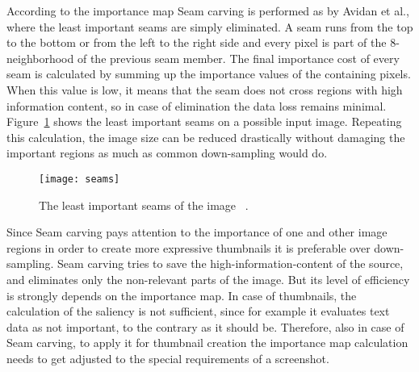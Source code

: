 \documentclass[draft,final]{vutinfth} %
\begin{document}
	According to the importance map Seam carving is performed as by Avidan et al.\cite{avidan2007seam}, where the least important seams are simply eliminated.
	A seam runs from the top to the bottom or from the left to the right side and every pixel is part of the 8-neighborhood of the previous seam member.
	The final importance cost of every seam is calculated by summing up the importance values of the containing pixels.
	When this value is low, it means that the seam does not cross regions with high information content, so in case of elimination the data loss remains minimal.
	Figure~\ref{fig:seamsDol} shows the least important seams on a possible input image.
	Repeating this calculation, the image size can be reduced drastically without damaging the important regions as much as common down-sampling would do.\par 
	\begin{figure}[H]
		\centering		
		\texttt{[image: seams]}
		\caption{The least important seams of the image ~\cite{avidan2007seam}.}
		\label{fig:seamsDol}
	\end{figure} 
	Since Seam carving pays attention to the importance of one and other image regions in order to create more expressive thumbnails it is preferable over down-sampling.
	Seam carving tries to save the high-information-content of the source, and eliminates only the non-relevant parts of the image.
	But its level of efficiency is strongly depends on the importance map.
	In case of thumbnails, the calculation of the saliency is not sufficient, since for example it evaluates text data as not important, to the contrary as it should be.
	Therefore, also in case of Seam carving, to apply it for thumbnail creation the importance map calculation needs to get adjusted to the special requirements of a screenshot. 
	
\end{document}
